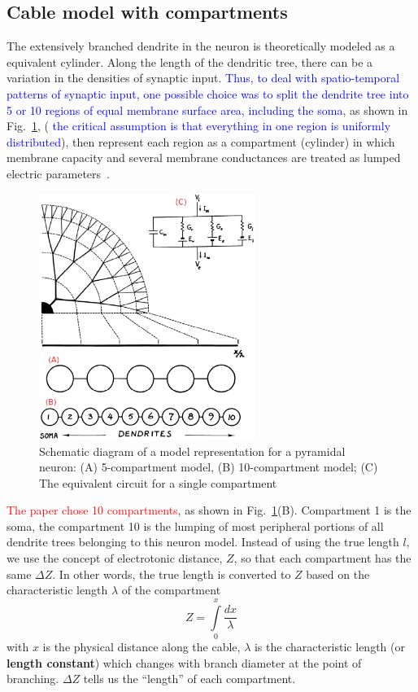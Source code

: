 \subsection{Cable model with compartments}
\label{sec:cylind-model-neur}

The extensively branched dendrite in the neuron is theoretically
modeled as a equivalent cylinder. Along the length of the dendritic
tree, there can be a variation in the densities of synaptic input.
\textcolor{blue}{Thus, to deal with spatio-temporal patterns of
  synaptic input, one possible choice was to split the dendrite tree
  into 5 or 10 regions of equal membrane surface area, including the
  soma},
as shown in Fig.~\ref{fig:cable_model}, (
\textcolor{blue}{the critical assumption is that everything in one
  region is uniformly distributed}),
then represent each region as a compartment (cylinder) in which
membrane capacity and several membrane conductances are treated as
lumped electric parameters~\citep{rall1967dts}.

\begin{figure}[hbt]
  \centerline{\includegraphics[height=8cm,
    angle=0]{./images/cable_model.eps}}
  \caption{Schematic diagram of a model representation for a pyramidal
    neuron: (A) 5-compartment model, (B) 10-compartment model; (C) The
    equivalent circuit for a single compartment}
\label{fig:cable_model}
\end{figure}

\textcolor{red}{The paper chose 10 compartments}, as shown in
Fig.~\ref{fig:cable_model}(B). Compartment 1 is the soma, the
compartment 10 is the lumping of most peripheral portions of all
dendrite trees belonging to this neuron model. Instead of using the
true length $l$, we use the concept of electrotonic distance, $Z$, so
that each compartment has the same $\Delta Z$.  In other words, the
true length is converted to $Z$ based on the characteristic length
$\lambda$ of the compartment
\begin{equation}
  \label{eq:402}
  Z = \int\limits_{0}^x \frac{dx}{\lambda}
\end{equation}
with $x$ is the physical distance along the cable, $\lambda$ is the
characteristic length (or {\bf length constant}) which changes with
branch diameter at the point of branching. 
$\Delta Z$ tells us the ``length'' of each compartment.


